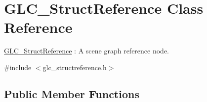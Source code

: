 \hypertarget{class_g_l_c___struct_reference}{\section{G\-L\-C\-\_\-\-Struct\-Reference Class Reference}
\label{class_g_l_c___struct_reference}
}


\hyperlink{class_g_l_c___struct_reference}{G\-L\-C\-\_\-\-Struct\-Reference} \-: A scene graph reference node.  




{\ttfamily \#include $<$glc\-\_\-structreference.\-h$>$}

\subsection*{Public Member Functions}
